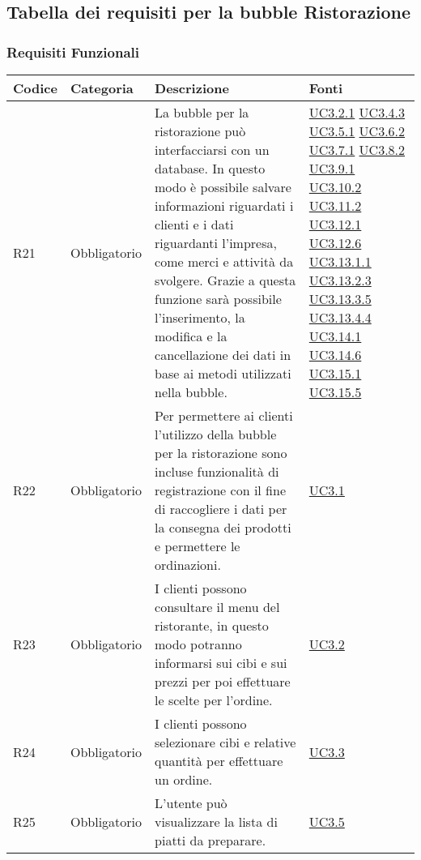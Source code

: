 \subsection{Tabella dei requisiti per la bubble Ristorazione}

\subsubsection{Requisiti Funzionali}

\begin{longtable}{|P{1.5cm}|P{3cm}|P{6cm}|P{2.5cm}|}
	\hline \textbf{Codice} & \textbf{Categoria} & \textbf{Descrizione} & \textbf{Fonti} \\
	\hline R21 & Obbligatorio & La bubble per la ristorazione può interfacciarsi con un database. In questo modo è possibile salvare informazioni riguardati i clienti e i dati riguardanti l’impresa, come merci e attività da svolgere. Grazie a questa funzione sarà possibile l’inserimento, la modifica e la cancellazione dei dati in base ai metodi utilizzati nella bubble. & \hyperref[UC3.2.1]{UC3.2.1} \hyperref[UC3.4.3]{UC3.4.3} \hyperref[UC3.5.1]{UC3.5.1} \hyperref[UC3.6.2]{UC3.6.2} \hyperref[UC3.7.1]{UC3.7.1} \hyperref[UC3.8.2]{UC3.8.2} \hyperref[UC3.9.1]{UC3.9.1} \hyperref[UC3.10.2]{UC3.10.2} \hyperref[UC3.11.2]{UC3.11.2} \hyperref[UC3.12.1]{UC3.12.1} \hyperref[UC3.12.6]{UC3.12.6} \hyperref[UC3.13.1.1]{UC3.13.1.1} \hyperref[UC3.13.2.3]{UC3.13.2.3} \hyperref[UC3.13.3.5]{UC3.13.3.5} \hyperref[UC3.13.4.4]{UC3.13.4.4} \hyperref[UC3.14.1]{UC3.14.1} \hyperref[UC3.14.6]{UC3.14.6} \hyperref[UC3.15.1]{UC3.15.1} \hyperref[UC3.15.5]{UC3.15.5} \\
	\hline R22 & Obbligatorio & Per permettere ai clienti l’utilizzo della bubble per la ristorazione sono incluse funzionalità di registrazione con il fine di raccogliere i dati per la consegna dei prodotti e permettere le ordinazioni. & \hyperref[UC3.1]{UC3.1} \\
	\hline R23 & Obbligatorio & I clienti possono consultare il menu del ristorante, in questo modo potranno informarsi sui cibi e sui prezzi per poi effettuare le scelte per l’ordine. & \hyperref[UC3.2]{UC3.2} \\
	\hline R24 & Obbligatorio & I clienti possono selezionare cibi e relative quantità per effettuare un ordine. & \hyperref[UC3.3]{UC3.3} \\
	\hline R25 & Obbligatorio & L’utente  può visualizzare la lista di piatti da preparare. & \hyperref[UC3.5]{UC3.5} \\

\end{longtable}
